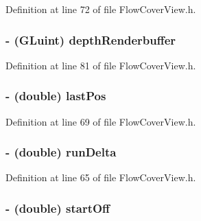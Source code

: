 Definition at line 72 of file FlowCoverView.h.

\hypertarget{interface_flow_cover_view_aa7c9cf3bf8b4be70bb35f472b8a45eda}{
\subsubsection[{depthRenderbuffer}]{\setlength{\rightskip}{0pt plus 5cm}-\/ (GLuint) {\bf depthRenderbuffer}}}
\label{interface_flow_cover_view_aa7c9cf3bf8b4be70bb35f472b8a45eda}


Definition at line 81 of file FlowCoverView.h.

\hypertarget{interface_flow_cover_view_ad65e2b4a144cd8065f78983d6130534a}{
\subsubsection[{lastPos}]{\setlength{\rightskip}{0pt plus 5cm}-\/ (double) {\bf lastPos}}}
\label{interface_flow_cover_view_ad65e2b4a144cd8065f78983d6130534a}


Definition at line 69 of file FlowCoverView.h.

\hypertarget{interface_flow_cover_view_a800395a77f71778e7c0dc0bd16ba352d}{
\subsubsection[{runDelta}]{\setlength{\rightskip}{0pt plus 5cm}-\/ (double) {\bf runDelta}}}
\label{interface_flow_cover_view_a800395a77f71778e7c0dc0bd16ba352d}


Definition at line 65 of file FlowCoverView.h.

\hypertarget{interface_flow_cover_view_a940d757461ee76fd56faddb9b5599771}{
\subsubsection[{startOff}]{\setlength{\rightskip}{0pt plus 5cm}-\/ (double) {\bf startOff}}}
\label{interface_flow_cover_view_a940d757461ee76fd56faddb9b5599771}


